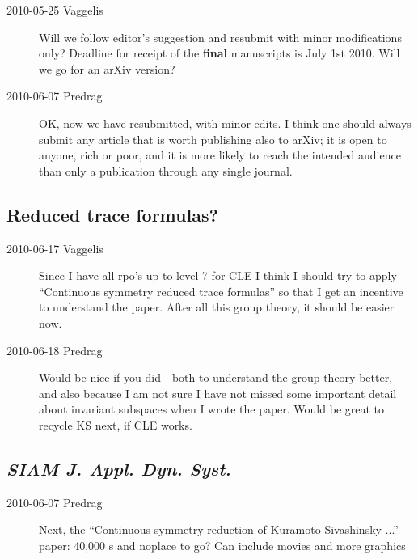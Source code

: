 \begin{description}

\item[2010-05-25 Vaggelis]
Will we follow editor's suggestion and resubmit with minor modifications only?
Deadline for receipt of the {\bf final} manuscripts is July 1st 2010.
Will we go for an arXiv version?

\item[2010-06-07 Predrag]
OK, now we have resubmitted, with minor edits. I think one should always submit
any article that is worth publishing also to arXiv;
it is open to anyone, rich or poor, and it is
more likely to reach the intended audience than only a publication through
any single journal.

\end{description}

\subsection{Reduced trace formulas?}

\begin{description}
 \item[2010-06-17 Vaggelis]
Since I have all rpo's up to level 7 for CLE I think I should try
to apply ``Continuous symmetry reduced trace formulas'' so that I get an incentive
to understand the paper. After all this group theory, it should be easier now.
 \item[2010-06-18 Predrag]
Would be nice if you did - both to understand the group theory better, and
also because I am not sure I have not missed some important detail about
invariant subspaces when I wrote the paper. Would be great to recycle KS
next, if CLE works.
\end{description}


\subsection{\emph{SIAM J. Appl. Dyn. Syst.}}

\begin{description}

\item[2010-06-07 Predrag] Next, the
``Continuous symmetry reduction of Kuramoto-Sivashinsky ...'' paper:
40,000 \rpo s and noplace to go?
Can include movies and more graphics

\end{description}
